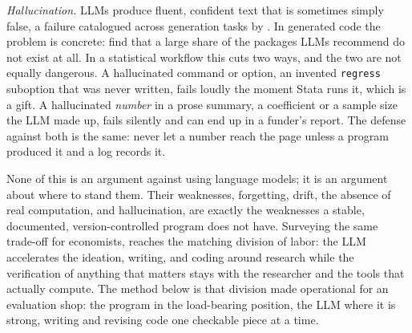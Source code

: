 \documentclass[
    a4paper,
    fontsize=10pt,
    twoside=true,
    numbers=noenddot,
]{kaobook}
\begin{document}
\emph{Hallucination.} LLMs produce fluent, confident text that is sometimes simply false, a failure catalogued across generation tasks by \textcite{ji2023survey}. In generated code the problem is concrete: \textcite{spracklen2025packages} find that a large share of the packages LLMs recommend do not exist at all. In a statistical workflow this cuts two ways, and the two are not equally dangerous. A hallucinated command or option, an invented \texttt{regress} suboption that was never written, fails loudly the moment Stata runs it, which is a gift. A hallucinated \emph{number} in a prose summary, a coefficient or a sample size the LLM made up, fails silently and can end up in a funder's report. The defense against both is the same: never let a number reach the page unless a program produced it and a log records it.

None of this is an argument against using language models; it is an argument about where to stand them. Their weaknesses, forgetting, drift, the absence of real computation, and hallucination, are exactly the weaknesses a stable, documented, version-controlled program does not have. Surveying the same trade-off for economists, \textcite{korinek2023genai} reaches the matching division of labor: the LLM accelerates the ideation, writing, and coding around research while the verification of anything that matters stays with the researcher and the tools that actually compute. The method below is that division made operational for an evaluation shop: the program in the load-bearing position, the LLM where it is strong, writing and revising code one checkable piece at a time.
\end{document}
